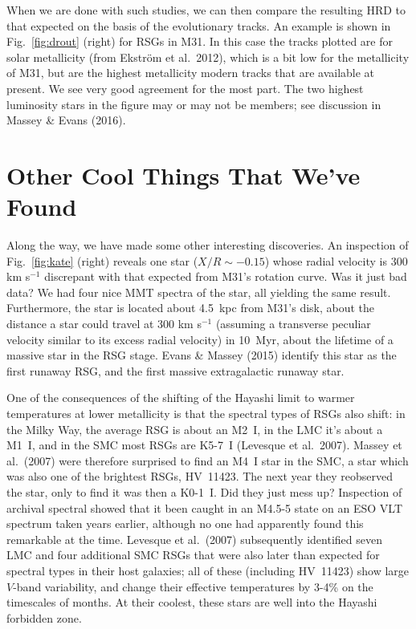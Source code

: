 \documentclass{iau}
\begin{document}
When we are done with such studies, we can then compare the resulting HRD to that expected on the basis of the evolutionary tracks.  An example is shown in Fig.~\ref{fig:drout} (right) for RSGs in M31.  In this case the tracks plotted are for
solar metallicity (from Ekstr{\"o}m et al.\ 2012), which is a bit low for the metallicity of M31, but are the highest metallicity
modern tracks that are available at present. We see very good agreement for the most part.  The two highest
luminosity stars in the figure may or may not be members; see discussion in Massey \& Evans (2016). 

\section{Other Cool Things That We've Found}

Along the way, we have made some other interesting discoveries.  An inspection of Fig.~\ref{fig:kate} (right) reveals one star
($X/R\sim -0.15$) whose radial velocity is 300 km s$^{-1}$ discrepant with that expected from M31's rotation curve.  Was it just bad data?  We had four nice MMT spectra of the star, all yielding the same result.  Furthermore, the star is located about 4.5~kpc from M31's disk, about the distance a star could travel at 300 km s$^{-1}$ (assuming a transverse peculiar velocity similar to its excess radial velocity) in 10~Myr, about the lifetime of a massive star in the RSG stage.  Evans \& Massey (2015) identify this star as the first runaway RSG, and the first massive extragalactic runaway star. 

One of the consequences of the shifting of the Hayashi limit to warmer temperatures at lower metallicity is that
the spectral types of RSGs also shift: in the Milky Way, the average RSG is about an M2~I, in the LMC it's
about a M1~I, and in the SMC most RSGs are K5-7~I (Levesque et al.\ 2007). 
Massey et al.\ (2007) were therefore surprised to
find an M4~I star in the SMC, a star which was also one of the brightest RSGs, HV~11423.  The next year they reobserved
the star, only to find it was then a K0-1~I.  Did they just mess up?  Inspection of archival spectral showed that it been
caught in an M4.5-5 state on an ESO VLT spectrum taken years earlier, although no one had apparently found this remarkable at the time.  
Levesque et al.\ (2007) subsequently identified seven LMC and four additional SMC RSGs that were also later than expected
for spectral types in their host galaxies; all of these (including HV~11423) show large $V$-band variability, and change their
effective temperatures by 3-4\% on the timescales of months.  At their coolest, these stars are well into the Hayashi forbidden zone.
\end{document}
